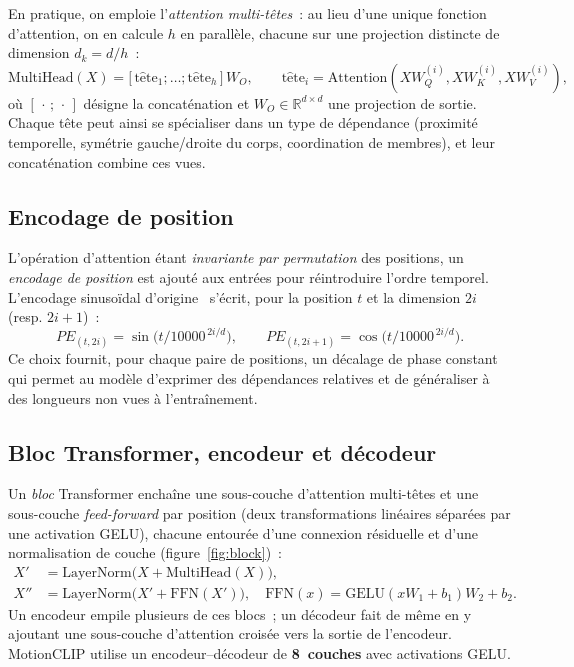 \documentclass[12pt,a4paper,oneside]{report}
\theoremstyle{definition}
\theoremstyle{plain}
\newcommand{\R}{\mathbb{R}}
\begin{document}
En pratique, on emploie l'\emph{attention multi-têtes}~: au lieu d'une unique
fonction d'attention, on en calcule $h$ en parallèle, chacune sur une projection
distincte de dimension $d_k = d/h$~:
\begin{equation}
\mathrm{MultiHead}(X) = \big[\,\mathrm{t\hat{e}te}_1;\dots;\mathrm{t\hat{e}te}_h\,\big]\,W_O,
\qquad
\mathrm{t\hat{e}te}_i = \mathrm{Attention}(XW_Q^{(i)}, XW_K^{(i)}, XW_V^{(i)}),
\end{equation}
où $[\,\cdot\,;\,\cdot\,]$ désigne la concaténation et $W_O\in\R^{d\times d}$ une
projection de sortie. Chaque tête peut ainsi se spécialiser dans un type de
dépendance (proximité temporelle, symétrie gauche/droite du corps, coordination de
membres), et leur concaténation combine ces vues.

\subsection{Encodage de position}

L'opération d'attention étant \emph{invariante par permutation} des positions, un
\emph{encodage de position} est ajouté aux entrées pour réintroduire l'ordre
temporel. L'encodage sinusoïdal d'origine~\cite{vaswani2017attention} s'écrit, pour
la position $t$ et la dimension $2i$ (resp. $2i+1$)~:
\begin{equation}
PE_{(t,2i)} = \sin\!\big(t/10000^{\,2i/d}\big),\qquad
PE_{(t,2i+1)} = \cos\!\big(t/10000^{\,2i/d}\big).
\end{equation}
Ce choix fournit, pour chaque paire de positions, un décalage de phase constant qui
permet au modèle d'exprimer des dépendances relatives et de généraliser à des
longueurs non vues à l'entraînement.

\subsection{Bloc Transformer, encodeur et décodeur}

Un \emph{bloc} Transformer enchaîne une sous-couche d'attention multi-têtes et une
sous-couche \emph{feed-forward} par position (deux transformations linéaires
séparées par une activation GELU), chacune entourée d'une connexion résiduelle et
d'une normalisation de couche (figure~\ref{fig:block})~:
\begin{align}
X' &= \mathrm{LayerNorm}\big(X + \mathrm{MultiHead}(X)\big),\\
X'' &= \mathrm{LayerNorm}\big(X' + \mathrm{FFN}(X')\big),\quad
\mathrm{FFN}(x) = \mathrm{GELU}(xW_1 + b_1)W_2 + b_2 .
\end{align}
Un encodeur empile plusieurs de ces blocs~; un décodeur fait de même en y
ajoutant une sous-couche d'attention croisée vers la sortie de l'encodeur.
MotionCLIP utilise un encodeur--décodeur de \textbf{8~couches} avec activations
GELU.
\end{document}
